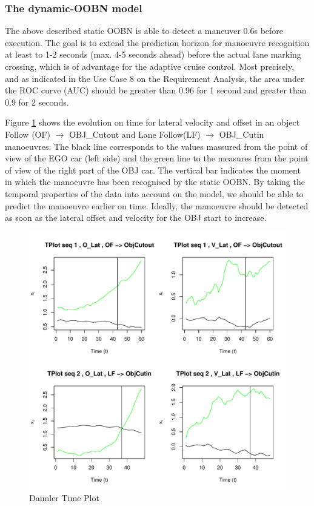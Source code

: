 \subsubsection*{The dynamic-OOBN model}

The above described static OOBN is able to detect a maneuver 0.6s before execution. The goal is to extend the prediction horizon for manoeuvre recognition at least to 1-2 seconds (max. 4-5 seconds ahead) before the actual lane marking crossing, which is of advantage for the adaptive cruise control. Most precisely, and as indicated in the Use Case 8 on the Requirement Analysis,  the area under the ROC curve (AUC) should be greater than 0.96 for 1 second and greater than 0.9 for 2 seconds.

Figure \ref{Figure:daimlerTPlot} shows the evolution on time for lateral velocity and offset in an object Follow (OF) $\rightarrow$ OBJ\_Cutout and Lane Follow(LF) $\rightarrow$ OBJ\_Cutin manoeuvres. The black line corresponds to the values massured from the point of view of the EGO car (left side) and the green line to the measures from the point of view of the right part of the OBJ car. The vertical bar indicates the moment in which the manoeuvre has been recognised by the static OOBN. By taking the temporal properties of the data into account on the model, we should be able to predict the manoeuvre earlier on time. Ideally, the manoeuvre should be detected as soon as the lateral offset and velocity for the OBJ start to increase. 

\begin{figure}[tb]
\begin{center}
\includegraphics[scale=0.65]{./figures/DaimlerLE_EGO_L_LE_OBJ_L_OBJCut.pdf}
\caption{\label{Figure:daimlerTPlot}Daimler Time Plot}
\end{center}
\end{figure}

